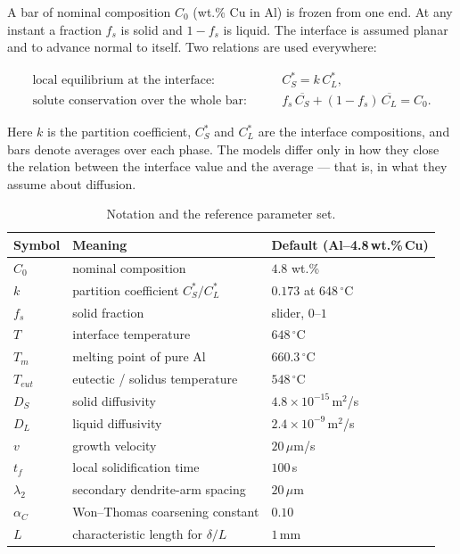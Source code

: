 \documentclass[11pt,a4paper]{article}
\begin{document}
A bar of nominal composition $C_0$ (wt.\% Cu in Al) is frozen from one end. At
any instant a fraction $f_s$ is solid and $1-f_s$ is liquid. The interface is
assumed planar and to advance normal to itself. Two relations are used
everywhere:

\begin{align}
  \text{local equilibrium at the interface:}\qquad & C_S^* = k\,C_L^*, \label{eq:partition}\\
  \text{solute conservation over the whole bar:}\qquad &
  f_s\,\overline{C_S} + (1-f_s)\,\overline{C_L} = C_0. \label{eq:balance}
\end{align}

Here $k$ is the partition coefficient, $C_S^*$ and $C_L^*$ are the interface
compositions, and bars denote averages over each phase. The models differ only
in how they close the relation between the interface value and the average ---
that is, in what they assume about diffusion.

\begin{table}[h]
\centering
\small
\begin{tabular}{@{}lll@{}}
\toprule
\textbf{Symbol} & \textbf{Meaning} & \textbf{Default (Al--4.8\,wt.\%\,Cu)}\\
\midrule
$C_0$ & nominal composition & $4.8$ wt.\%\\
$k$ & partition coefficient $C_S^*/C_L^*$ & $0.173$ at 648\,$^\circ$C\\
$f_s$ & solid fraction & slider, $0$--$1$\\
$T$ & interface temperature & $648\,^\circ$C\\
$T_m$ & melting point of pure Al & $660.3\,^\circ$C\\
$T_{eut}$ & eutectic / solidus temperature & $548\,^\circ$C\\
$D_S$ & solid diffusivity & $4.8\times10^{-15}$\,m$^2$/s\\
$D_L$ & liquid diffusivity & $2.4\times10^{-9}$\,m$^2$/s\\
$v$ & growth velocity & $20\,\mu$m/s\\
$t_f$ & local solidification time & $100$\,s\\
$\lambda_2$ & secondary dendrite-arm spacing & $20\,\mu$m\\
$\alpha_C$ & Won--Thomas coarsening constant & $0.10$\\
$L$ & characteristic length for $\delta/L$ & $1$\,mm\\
\bottomrule
\end{tabular}
\caption{Notation and the reference parameter set.}
\end{table}
\end{document}
